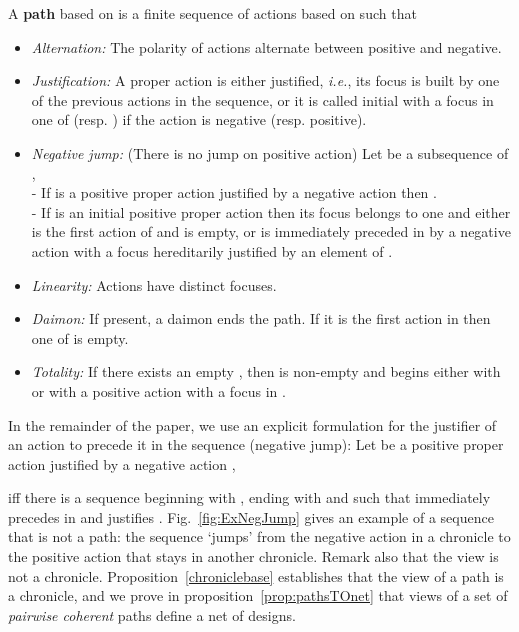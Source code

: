 \documentclass{LMCS}
\def\ie{{\em i.e.}}
\begin{document}
\begin{defi}[Path]\label{defi:path}
A {\bf path}  based on  is a finite sequence of
actions based on  such that
\begin{itemize}
\item {\em Alternation:} The polarity of actions alternate between
positive and negative.
\item {\em Justification:} A proper action is either justified, \ie, its
focus is built by one of the previous actions in the sequence, or it is
called initial with a focus in one of  (resp. ) if
the action is negative (resp. positive).
\item {\em Negative jump:} (There is no jump on positive action) Let  be a subsequence of ,\\
- If   is a positive proper action justified by a negative
action  then .\\
- If   is an initial positive proper action then its focus belongs to
one   and either  is  the first action of 
and  is empty, or   is immediately preceded in
 by a negative action with a focus hereditarily justified by an element
of .
\item {\em Linearity:} Actions have distinct focuses.
\item {\em Daimon:} If present, a daimon ends the path. If it is the
first action in  then one of  is empty.
\item {\em Totality:} If there exists an empty , then  is non-empty and begins either with  or with a positive action with a focus in .
\end{itemize}
\end{defi}

\noindent In the remainder of the paper, we use an explicit formulation for the justifier of an action to precede it in the sequence (negative jump): Let  be a positive proper action justified by a negative
action , 

iff
there is a sequence
  beginning with
, ending with  and such that
 immediately precedes  in  and
 justifies .
Fig.~\ref{fig:ExNegJump} gives an example of a sequence that is not a path: the sequence  `jumps' from the negative action  in a chronicle to the positive action  that stays in another chronicle.
Remark also that the view  is not a chronicle. Proposition~\ref{chroniclebase} establishes that the view of a path is a chronicle, and we prove in proposition~\ref{prop:pathsTOnet} that views of a set of {\em pairwise coherent} paths define a net of designs.
\end{document}
